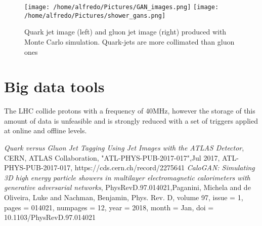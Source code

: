 \documentclass{PoS}
\begin{document}
\begin{figure}
\begin{center}
  \texttt{[image: /home/alfredo/Pictures/GAN\_images.png]}
  \texttt{[image: /home/alfredo/Pictures/shower\_gans.png]}
  \caption{Quark jet image (left) and gluon jet image (right) produced with Monte Carlo simulation. Quark-jets are more collimated than gluon ones}
  \label{fig:jet_images}
\end{center}
\end{figure}


\section{Big data tools}

The LHC collide protons with a frequency of 40MHz, however the storage of this amount of data is unfeasible and is strongly reduced with a
set of triggers applied at online and offline levels. 





\begin{thebibliography}{99}
  \emph{Quark versus Gluon Jet Tagging Using Jet Images with the ATLAS Detector}, CERN, ATLAS Collaboration, "ATL-PHYS-PUB-2017-017",Jul 2017, ATL-PHYS-PUB-2017-017, https://cds.cern.ch/record/2275641
  \emph{CaloGAN: Simulating 3D high energy particle showers in multilayer electromagnetic calorimeters with generative adversarial networks},
  PhysRevD.97.014021,Paganini, Michela and de Oliveira, Luke and Nachman, Benjamin, Phys. Rev. D, volume 97, issue = 1, pages = 014021, numpages = 12, year = 2018,
  month = {Jan}, doi = {10.1103/PhysRevD.97.014021}
\end{thebibliography}
\end{document}
